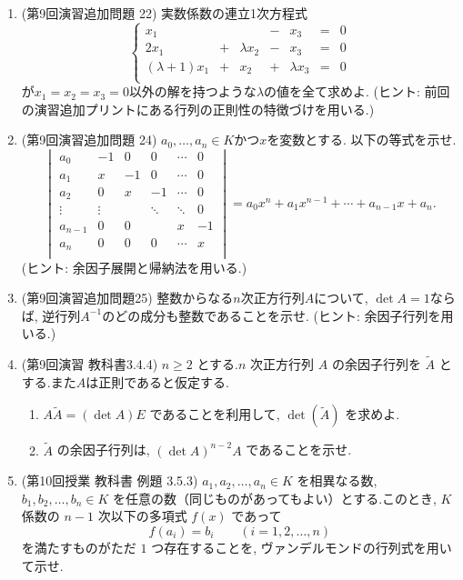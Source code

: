 \documentclass[dvipdfmx,a4paper,11pt]{article} %
\theoremstyle{definition}
\begin{document}
\begin{enumerate}[label=\textbf{問題}\arabic*.]
 \item (第9回演習追加問題 22) 実数係数の連立1次方程式
 $$
 \left\{ 
\begin{matrix}
x_1&  &  &  -& x_3&= & 0\\
2x_1&+&\lambda x_2& -&x_3&= & 0\\
(\lambda + 1)x_1& +&x_2& + &\lambda x_3&=&0\\
\end{matrix}
\right.
 $$
 が$x_1=x_2=x_3=0$以外の解を持つような$\lambda$の値を全て求めよ.
 (ヒント:  前回の演習追加プリントにある行列の正則性の特徴づけを用いる.)
 \item (第9回演習追加問題 24) $a_0, \ldots, a_n \in K$かつ$x$を変数とする. 
 以下の等式を示せ. 
 $$
 \begin{vmatrix}
a_0   &   -1   &0 &0 & \cdots &  0 \\
a_1   &   x    &-1  &0 & \cdots &  0 \\
a_2   &   0    & x   &-1 & \cdots &  0 \\
\vdots  &    \vdots   &   &\ddots & \ddots &  0 \\
a_{n-1}&   0    & 0   &                  & x&  -1\\
a_n   &   0   & 0   &0 & \cdots &  x\\
\end{vmatrix}
=a_0 x^{n} +  a_1 x^{n-1} +  \cdots +  a_{n-1} x + a_{n}.
$$
(ヒント: 余因子展開と帰納法を用いる.)

 \item (第9回演習追加問題25)  整数からなる$n$次正方行列$A$について, $\det A=1$ならば, 逆行列$A^{-1}$のどの成分も整数であることを示せ. (ヒント: 余因子行列を用いる.)
 

\item (第9回演習 教科書3.4.4) $n\geq 2$ とする.$n$ 次正方行列 $A$ の余因子行列を $\widetilde A$ とする.また$A$は正則であると仮定する. 
 \begin{enumerate}[label=(\arabic*)]
\item
\(
A\widetilde A=(\det A)E
\)
であることを利用して, 
\(
\det (\widetilde A)
\)
を求めよ.

\item $\widetilde A$ の余因子行列は, 
\(
(\det A)^{n-2}A
\)
であることを示せ.
\end{enumerate}

\item (第10回授業 教科書 例題 3.5.3) 
$a_1,a_2,\ldots,a_n\in K$ を相異なる数, $b_1,b_2,\ldots,b_n\in K$ を任意の数（同じものがあってもよい）とする.このとき, $K$ 係数の $n-1$ 次以下の多項式 $f(x)$ であって
\[
f(a_i)=b_i
\qquad
(i=1,2,\ldots,n)
\]
を満たすものがただ $1$ つ存在することを, ヴァンデルモンドの行列式を用いて示せ.
\end{enumerate}
\end{document}
